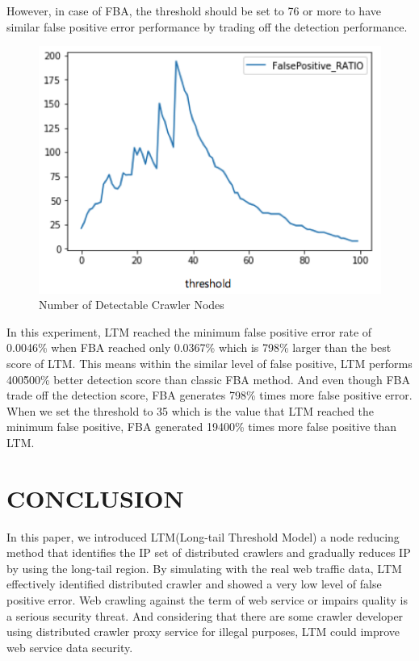 \documentclass[sigconf,anonymous=true]{acmart}
\begin{document}
 However, in case of FBA, the threshold should be set to 76 or more to have similar false positive error performance by trading off the detection performance.\\

\begin{figure}[H]
    \centering
    \includegraphics[width=0.85\columnwidth]{figs/figure_fp_ratio.png}
    \caption{Number of Detectable Crawler Nodes}
    \label{fig:my_label}
\end{figure}

In this experiment, LTM reached the minimum false positive error rate of 0.0046\% when FBA reached only 0.0367\% which is 798\% larger than the best score of LTM. This means within the similar level of false positive, LTM performs 400\~500\% better detection score than classic FBA method. And even though FBA trade off the detection score, FBA generates 798\% times more false positive error. When we set the threshold to 35 which is the value that LTM reached the minimum false positive, FBA generated 19400\% times more false positive than LTM.


%
%
\section{CONCLUSION}
In this paper, we introduced LTM(Long-tail Threshold Model) a node reducing method that identifies the IP set of distributed crawlers and gradually reduces IP by using the long-tail region.
By simulating with the real web traffic data, LTM effectively identified distributed crawler and showed a very low level of false positive error.
Web crawling against the term of web service or impairs quality is a serious security threat. And considering that there are some crawler developer using distributed crawler proxy service for illegal purposes, LTM could improve web service data security.
\end{document}

